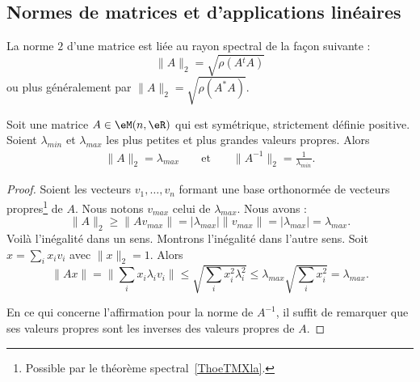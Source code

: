\subsection{Normes de matrices et d'applications linéaires}
\label{subsecNomrApplLin}

\begin{theorem}       \label{THOooNDQSooOUWQrK}
    La norme $2$ d'une matrice est liée au rayon spectral de la façon suivante :
    \begin{equation}
        \|A\|_2=\sqrt{\rho(A{^t}A)}
    \end{equation}
    ou plus généralement par \( \| A \|_2=\sqrt{\rho(A^*A)}\).
\end{theorem}

\begin{lemma}       \label{LEMooNESTooVvUEOv}
    Soit une matrice \( A\in \eM(n,\eR)\) qui est symétrique, strictement définie positive. Soient \( \lambda_{min}\) et \( \lambda_{max}\) les plus petites et plus grandes valeurs propres. Alors
    \begin{subequations}
        \begin{align}
            \| A \|_2=\lambda_{max}&&\text{ et }&&\|A^{-1}  \|_2=\frac{1}{ \lambda_{min} }.
        \end{align}
    \end{subequations}
\end{lemma}

\begin{proof}
    Soient les vecteurs \( v_1,\ldots, v_n\) formant une base orthonormée de vecteurs propres\footnote{Possible par le théorème spectral~\ref{ThoeTMXla}.} de \( A\). Nous notons \( v_{max}\) celui de \( \lambda_{max}\). Nous avons :
    \begin{equation}
        \| A \|_2\geq \| Av_{max} \|=| \lambda_{max} |\| v_{max} \|=| \lambda_{max} |=\lambda_{max}.
    \end{equation}
    Voilà l'inégalité dans un sens. Montrons l'inégalité dans l'autre sens. Soit \( x=\sum_ix_iv_i\) avec \( \| x \|_2=1\). Alors
    \begin{equation}
        \| Ax \|=\| \sum_ix_i\lambda_iv_i \|\leq\sqrt{ \sum_ix_i^2\lambda_i^2 }\leq \lambda_{max}\sqrt{ \sum_ix_i^2}=\lambda_{max}.
    \end{equation}

    En ce qui concerne l'affirmation pour la norme de \( A^{-1}\), il suffit de remarquer que ses valeurs propres sont les inverses des valeurs propres de \( A\).
\end{proof}

